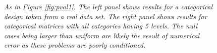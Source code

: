 \documentclass{imsart}
\begin{document}
\begin{figure}[!htp]
\begin{center}
\hspace{-15pt}
\caption{\small \em
As in Figure \ref{fig:pval1}.
The left panel shows results for a categorical design
taken from a real data set.
The right panel shows results for categorical matrices with all categories having 5 levels. The null cases being larger than uniform are likely the result of numerical error as these problems are poorly conditioned.
}
\end{center}
\end{figure}
\end{document}
